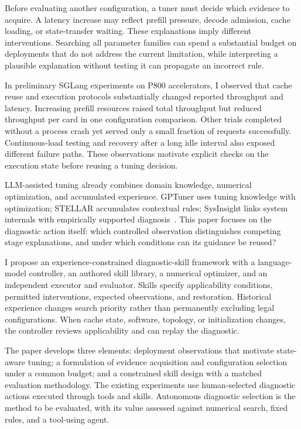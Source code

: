 \documentclass[11pt,a4paper]{article}
\begin{document}
Before evaluating another configuration, a tuner must decide which evidence to acquire. A latency increase may reflect prefill pressure, decode admission, cache loading, or state-transfer waiting. These explanations imply different interventions. Searching all parameter families can spend a substantial budget on deployments that do not address the current limitation, while interpreting a plausible explanation without testing it can propagate an incorrect rule.

In preliminary SGLang experiments on P800 accelerators, I observed that cache reuse and execution protocols substantially changed reported throughput and latency. Increasing prefill resources raised total throughput but reduced throughput per card in one configuration comparison. Other trials completed without a process crash yet served only a small fraction of requests successfully. Continuous-load testing and recovery after a long idle interval also exposed different failure paths. These observations motivate explicit checks on the execution state before reusing a tuning decision.

LLM-assisted tuning already combines domain knowledge, numerical optimization, and accumulated experience. GPTuner uses tuning knowledge with optimization; STELLAR accumulates contextual rules; SysInsight links system internals with empirically supported diagnosis~\cite{gptuner2024,stellar2025,sysinsight2026}. This paper focuses on the diagnostic action itself: which controlled observation distinguishes competing stage explanations, and under which conditions can its guidance be reused?

I propose an experience-constrained diagnostic-skill framework with a language-model controller, an authored skill library, a numerical optimizer, and an independent executor and evaluator. Skills specify applicability conditions, permitted interventions, expected observations, and restoration. Historical experience changes search priority rather than permanently excluding legal configurations. When cache state, software, topology, or initialization changes, the controller reviews applicability and can replay the diagnostic.

The paper develops three elements: deployment observations that motivate state-aware tuning; a formulation of evidence acquisition and configuration selection under a common budget; and a constrained skill design with a matched evaluation methodology. The existing experiments use human-selected diagnostic actions executed through tools and skills. Autonomous diagnostic selection is the method to be evaluated, with its value assessed against numerical search, fixed rules, and a tool-using agent.
\end{document}
